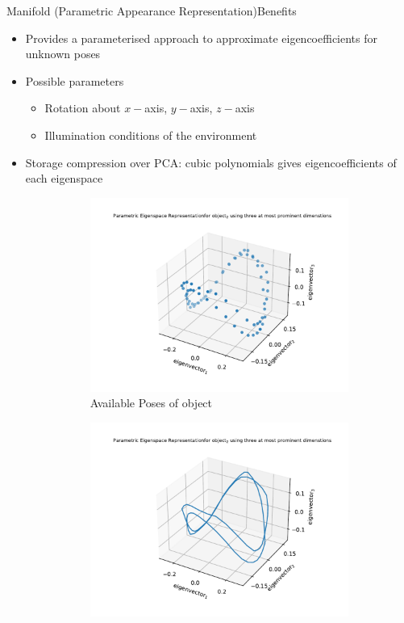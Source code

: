 \documentclass[aspectratio=169, handout, 10pt, hyperref=colorlinks]{beamer}
\begin{document}
\begin{frame}{Manifold (Parametric Appearance Representation)}{Benefits}
\begin{itemize}
    \item Provides a parameterised approach to approximate eigencoefficients for unknown poses
    \item Possible parameters
    \begin{itemize}
    \item Rotation about $x-$axis, $y-$axis, $z-$axis
    \item Illumination conditions of the environment
    \end{itemize}
    \item Storage compression over PCA: cubic polynomials gives eigencoefficients of each eigenspace
    \begin{figure}
        \centering
        \begin{subfigure}{0.45\linewidth}
            \centering
            \includegraphics[width = \linewidth]{manifold_scatter_2.pdf}
            \caption{Available Poses of object}
        \end{subfigure}
        \begin{subfigure}{0.45\linewidth}
            \centering
            \includegraphics[width = \linewidth]{manifold_plot_2.pdf}

\end{subfigure}
\end{figure}
\end{itemize}
\end{frame}
\end{document}
